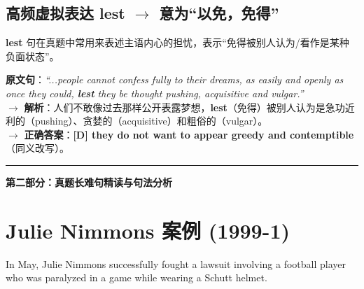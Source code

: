 \documentclass[cn,normal,11pt]{elegantnote}
\newcommand{\retrokey}[1]{{\color{accentcolor}\textbf{#1}}}
\begin{document}
\subsection{高频虚拟表达 lest \ensuremath{\rightarrow} 意为“以免，免得”}
\textbf{lest} 句在真题中常用来表述主语内心的担忧，表示“免得被别人认为/看作是某种负面状态”。

\begin{example}
  \textbf{原文句}：\textit{“...people cannot confess fully to their dreams, as easily and openly as once they could, \retrokey{lest} they be thought pushing, acquisitive and vulgar.”}\\
  $\rightarrow$ \textbf{解析}：人们不敢像过去那样公开表露梦想，\textbf{lest}（免得）被别人认为是急功近利的（pushing）、贪婪的（acquisitive）和粗俗的（vulgar）。\\
  $\rightarrow$ \textbf{正确答案}：\textbf{[D] they do not want to appear greedy and contemptible} （同义改写）。
\end{example}

\par\vspace{15pt}\hrule\vspace{15pt}

\begin{center}
  {\color{ecolor} \LARGE\bfseries 第二部分：真题长难句精读与句法分析}
\end{center}
\vspace{5pt}

\section{Julie Nimmons 案例 (1999-1)}
\begin{note}
  In May, Julie Nimmons successfully fought a lawsuit involving a football player who was paralyzed in a game while wearing a Schutt helmet.
\end{note}
\end{document}
